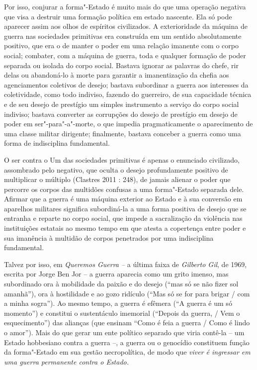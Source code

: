 Por isso, conjurar a forma"-Estado é muito mais do que uma operação
negativa que visa a destruir uma formação política em estado nascente.
Ela só pode aparecer assim aos olhos de espíritos civilizados. A
exterioridade da máquina de guerra nas sociedades primitivas era
construída em um sentido absolutamente positivo, que era o de manter o
poder em uma relação imanente com o corpo social; combater, com a
máquina de guerra, toda e qualquer formação de poder separada ou isolada
do corpo social. Bastava ignorar as palavras do chefe, rir delas ou
abandoná-lo à morte para garantir a imanentização da chefia aos
agenciamentos coletivos de desejo; bastava subordinar a guerra aos
interesses da coletividade, como todo indiviso, fazendo do guerreiro, de
sua capacidade técnica e de seu desejo de prestígio um simples
instrumento a serviço do corpo social indiviso; bastava converter as
corrupções do desejo de prestígio em desejo de poder em
ser"-para"-a"-morte, o que impedia pragmaticamente o aparecimento de uma
classe militar dirigente; finalmente, bastava conceber a guerra como uma
forma de indisciplina fundamental.

O ser contra o Um das sociedades primitivas é apenas o enunciado
civilizado, assombrado pelo negativo, que oculta o desejo profundamente
positivo de multiplicar o múltiplo (Clastres 2011 : 248), de jamais
alienar o poder que percorre os corpos das multidões confusas a uma
forma"-Estado separada dele. Afirmar que a guerra é uma máquina exterior
ao Estado e à sua conversão em aparelhos militares significa
subordiná-la a uma forma positiva de desejo que se entranha e reparte no
corpo social, que impede a sacralização da violência nas instituições
estatais ao mesmo tempo em que atesta a copertença entre poder e sua
imanência à multidão de corpos penetrados por uma indisciplina
fundamental.

Talvez por isso, em \emph{Queremos Guerra -- }a última faixa de
\emph{Gilberto Gil}, de 1969, escrita por Jorge Ben Jor -- a guerra
aparecia como um grito imenso, mas subordinado ora à mobilidade da
paixão e do desejo (``mas só se não fizer sol amanhã''), ora à
hostilidade e ao gozo ridículo (``Mas só se for para brigar / com a
minha sogra''). Ao mesmo tempo, a guerra é efêmera (``A guerra é um só
momento'') e constitui o sustentáculo imemorial (``Depois da guerra, /
Vem o esquecimento'') das alianças (que ensinam ``Como é feia a guerra /
Como é lindo o amor''). Mais do que gerar um ente político separado que
viria contê-la -- um Estado hobbesiano contra a guerra --, a guerra ou o
genocídio constituem função da forma"-Estado em sua gestão necropolítica,
de modo que \emph{viver é ingressar em uma guerra permanente contra o
Estado.}

